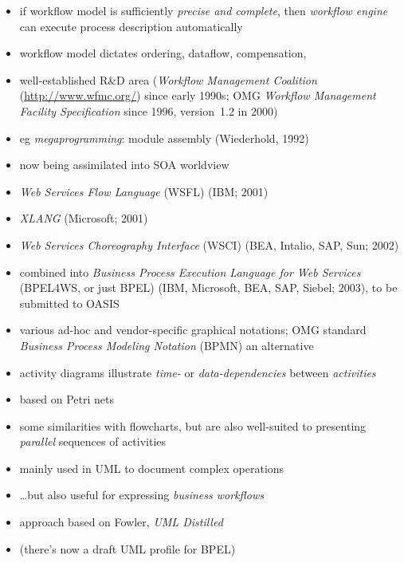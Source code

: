 \documentclass{sepslide-soa-faked} %
\begin{document}
\begin{slide}
\begin{itemize}
\item if workflow model is sufficiently \emph{precise and complete},
   then \emph{workflow engine} can execute process description automatically
\item workflow model dictates ordering, dataflow, compensation,
\item well-established R\&D area (\emph{Workflow Management Coalition}
  (\url{http://www.wfmc.org/}) since early 1990s; OMG \emph{Workflow
    Management Facility Specification} 
  since 1996, version~1.2 in 2000)
\item eg \emph{megaprogramming}:  module assembly (Wiederhold, 1992)
\item now being assimilated into SOA worldview
\end{itemize}
\end{slide}

\begin{slide}
\begin{itemize}
\item \emph{Web Services Flow Language} (WSFL) (IBM; 2001)
\item \emph{XLANG} (Microsoft; 2001)
\item \emph{Web Services Choreography Interface} (WSCI)
(BEA, Intalio, SAP, Sun; 2002)
\item combined into \emph{Business Process Execution Language for Web
    Services} (BPEL4WS, or just BPEL) (IBM, Microsoft, BEA, SAP, Siebel;
  2003), to be submitted to OASIS
\item various ad-hoc and vendor-specific graphical notations; OMG standard \emph{Business Process Modeling Notation} (BPMN) an alternative
\end{itemize}
\end{slide}

\begin{slide}
\begin{itemize}
\item activity diagrams illustrate \emph{time-} or \emph{data-dependencies}
  between \emph{activities}
\item based on Petri nets
\item some similarities with flowcharts,
  but are also well-suited to presenting \emph{parallel} sequences of
  activities
\item mainly used in UML to document complex operations
\item \ldots but also useful for expressing \emph{business
  workflows} 
\item approach based on Fowler, \textit{UML Distilled}
\item (there's now a draft UML profile for BPEL)
\end{itemize}
\end{slide}
\end{document}
